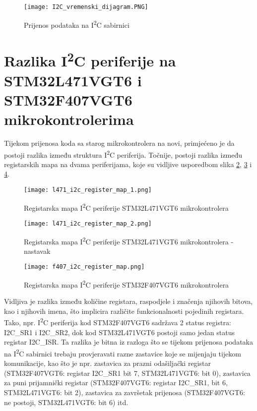 \begin{figure}[hp]
	\centering
	\texttt{[image: I2C\_vremenski\_dijagram.PNG]}
	\caption{Prijenos podataka na I\textsuperscript{2}C sabirnici
	\cite{i2c_manual}}
	\label{fig:i2c_timing_diagram_transaction}
\end{figure}

\section{Razlika I\textsuperscript{2}C periferije na STM32L471VGT6 i \newline STM32F407VGT6 mikrokontrolerima}

Tijekom prijenosa koda sa starog mikrokontrolera na novi, primjećeno je da postoji razlika između struktura I\textsuperscript{2}C periferija. Točnije, postoji razlika između registarskih mapa na dvama periferijama, koje su vidljive usporedbom slika \ref{fig:l471_i2c_register_map_1},  \ref{fig:l471_i2c_register_map_2} i \ref{fig:f407_i2c_diagram}.

\begin{figure}[H]
	\centering
	\texttt{[image: l471\_i2c\_register\_map\_1.png]}
	\caption{Registarska mapa I\textsuperscript{2}C periferije STM32L471VGT6
	mikrokontrolera \cite{l471_manual}}
	\label{fig:l471_i2c_register_map_1}
\end{figure}
\begin{figure}[H]
	\centering
	\texttt{[image: l471\_i2c\_register\_map\_2.png]}
	\caption{Registarska mapa I\textsuperscript{2}C periferije STM32L471VGT6
	mikrokontrolera - nastavak \cite{l471_manual}}
	\label{fig:l471_i2c_register_map_2}
\end{figure}
\begin{figure}[H]
	\centering
	\texttt{[image: f407\_i2c\_register\_map.png]}
	\caption{Registarska mapa I\textsuperscript{2}C periferije STM32F407VGT6
	mikrokontrolera\cite{f407_manual}}
	\label{fig:f407_i2c_diagram}
\end{figure}

Vidljiva je razlika između količine registara, raspodjele i značenja njihovih bitova, kao i njihovih imena, što implicira različite funkcionalnosti pojedinih registara. Tako, npr. I\textsuperscript{2}C periferija kod STM32F407VGT6 sadržava 2 status registra: I2C\_SR1 i I2C\_SR2, dok kod STM32L471VGT6 postoji samo jedan status registar I2C\_ISR. Ta razlika je bitna iz razloga što se tijekom prijenosa podataka na I\textsuperscript{2}C sabirnici trebaju provjeravati razne zastavice koje se mijenjaju tijekom komunikacije, kao što je npr. zastavica za prazni odašiljački registar (STM32F407VGT6: registar I2C\_SR1 bit 7, STM32L471VGT6: bit 0), zastavica za puni prijamnički registar (STM32F407VGT6: registar I2C\_SR1, bit 6, STM32L471VGT6: bit 2), zastavica za završetak prijenosa (STM32F407VGT6: ne postoji, STM32L471VGT6: bit 6) itd.

